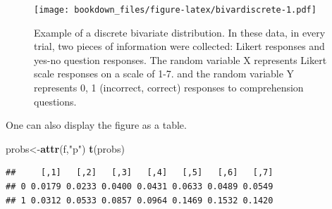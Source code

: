 \documentclass[12pt,]{krantz}
\newenvironment{Shaded}{\begin{snugshade}}{\end{snugshade}}
\newcommand{\CommentTok}[1]{\textcolor[rgb]{0.56,0.35,0.01}{\textit{#1}}}
\newcommand{\DataTypeTok}[1]{\textcolor[rgb]{0.13,0.29,0.53}{#1}}
\newcommand{\DecValTok}[1]{\textcolor[rgb]{0.00,0.00,0.81}{#1}}
\newcommand{\KeywordTok}[1]{\textcolor[rgb]{0.13,0.29,0.53}{\textbf{#1}}}
\newcommand{\NormalTok}[1]{#1}
\newcommand{\OperatorTok}[1]{\textcolor[rgb]{0.81,0.36,0.00}{\textbf{#1}}}
\newcommand{\OtherTok}[1]{\textcolor[rgb]{0.56,0.35,0.01}{#1}}
\newcommand{\StringTok}[1]{\textcolor[rgb]{0.31,0.60,0.02}{#1}}
\theoremstyle{definition}
\theoremstyle{definition}
\theoremstyle{definition}
\theoremstyle{remark}
\begin{document}
\begin{Shaded}
\end{Shaded}

\begin{figure}
\centering
\texttt{[image: bookdown\_files/figure-latex/bivardiscrete-1.pdf]}
\caption{\label{fig:bivardiscrete}Example of a discrete bivariate distribution. In these data, in every trial, two pieces of information were collected: Likert responses and yes-no question responses. The random variable X represents Likert scale responses on a scale of 1-7. and the random variable Y represents 0, 1 (incorrect, correct) responses to comprehension questions.}
\end{figure}

One can also display the figure as a table.

\begin{Shaded}
\begin{Highlighting}[]
\NormalTok{probs<-}\KeywordTok{attr}\NormalTok{(f,}\StringTok{"p"}\NormalTok{)}
\KeywordTok{t}\NormalTok{(probs)}
\end{Highlighting}
\end{Shaded}

\begin{verbatim}
##     [,1]   [,2]   [,3]   [,4]   [,5]   [,6]   [,7]
## 0 0.0179 0.0233 0.0400 0.0431 0.0633 0.0489 0.0549
## 1 0.0312 0.0533 0.0857 0.0964 0.1469 0.1532 0.1420
\end{verbatim}
\end{document}
